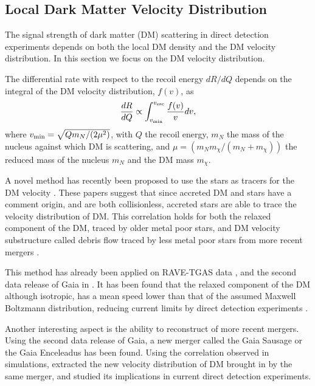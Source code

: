 \subsection{Local Dark Matter Velocity Distribution }


The signal strength of dark matter (DM) scattering in direct detection experiments depends on both the local DM density and the DM velocity distribution. In this section we focus on the DM velocity distribution.

The differential rate with respect to the recoil energy $dR/dQ$ depends on the integral of the DM velocity distribution, $f(v)$, as
\begin{equation}
    \frac{dR}{dQ} \propto \int_{v_{\rm{min}}}^{v_{\rm{esc}}} \frac{f(v)}{v} dv, 
\end{equation}
where $v_{\rm{min}} = \sqrt{Q m_N/ (2 \mu^2)}$, with $Q$ the recoil energy, $m_N$ the mass of the nucleus against which DM is scattering, and $\mu = (m_N m_\chi / (m_N + m_\chi))$ the reduced mass of the nucleus $m_N$ and the DM mass $m_\chi$.

A novel method has recently been proposed to use the stars as tracers for the DM velocity \citep{Herzog-Arbeitman:2017fte,Necib:2018b}. These papers suggest that since accreted DM and stars have a comment origin, and are both collisionless, accreted stars are able to trace the velocity distribution of DM. This correlation holds for both the relaxed component of the DM, traced by older metal poor stars, and DM velocity substructure called debris flow traced by less metal poor stars from more recent mergers \citep{Lisanti:2011as,Kuhlen:2012fz,Lisanti:2014dva}. 

This method has already been applied on RAVE-TGAS data \citep{Herzog-Arbeitman:2017zbm}, and the second data release of Gaia in \cite{necib2018}. It has been found that the relaxed component of the DM although isotropic, has a mean speed lower than that of the assumed Maxwell Boltzmann distribution, reducing current limits by direct detection experiments \citep{Aprile:2018dbl}.

Another interesting aspect is the ability to reconstruct of more recent mergers. Using the second data release of Gaia, a new merger called the Gaia Sausage or the Gaia Enceleadus \citep{2018MNRAS.477.1472B,2018Natur.563...85H} has been found. Using the correlation observed in simulations, \cite{necib2018} extracted the new velocity distribution of DM brought in by the same merger, and studied its implications in current direct detection experiments. 

